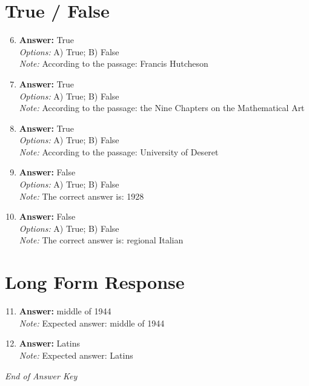 \documentclass[12pt]{article}
\begin{document}
\section*{True / False}
\begin{enumerate}[label=\arabic*.]
\setcounter{enumi}{5}
\item \textbf{Answer:} True
\\ \textit{Options:} A) True; B) False
\\ \textit{Note:} According to the passage: Francis Hutcheson
\item \textbf{Answer:} True
\\ \textit{Options:} A) True; B) False
\\ \textit{Note:} According to the passage: the Nine Chapters on the Mathematical Art
\item \textbf{Answer:} True
\\ \textit{Options:} A) True; B) False
\\ \textit{Note:} According to the passage: University of Deseret
\item \textbf{Answer:} False
\\ \textit{Options:} A) True; B) False
\\ \textit{Note:} The correct answer is: 1928
\item \textbf{Answer:} False
\\ \textit{Options:} A) True; B) False
\\ \textit{Note:} The correct answer is: regional Italian
\end{enumerate}

\section*{Long Form Response}
\begin{enumerate}[label=\arabic*.]
\setcounter{enumi}{10}
\item \textbf{Answer:} middle of 1944
\\ \textit{Note:} Expected answer: middle of 1944
\item \textbf{Answer:} Latins
\\ \textit{Note:} Expected answer: Latins
\end{enumerate}

\vfill
\noindent\textit{End of Answer Key}
\end{document}
